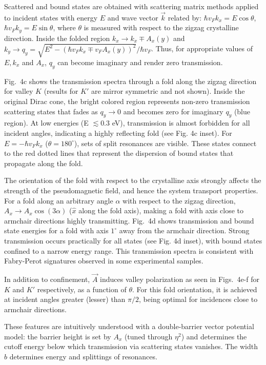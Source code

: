 \documentclass[journal=jacsat,manuscript=article]{achemso}
\begin{document}
Scattered and bound states are obtained with scattering matrix  methods applied to incident states with energy $E$ and wave vector $\vec{k}$ related by: $\hbar v_F k_x=E\cos\theta$, $\hbar v_F k_y=E\sin\theta$, where $\theta$ is measured with respect to the zigzag crystalline direction. Inside the folded region $k_x\rightarrow k_x\mp A_x(y)$ and $k_y\rightarrow q_y=\sqrt{E^2-(\hbar v_F k_x\mp v_FA_x(y))^2}/\hbar v_F$. Thus, for appropriate values of $E, k_x$ and $A_x$, $q_y$ can become imaginary and render zero transmission.

Fig.~4c shows the transmission spectra through a fold along the zigzag direction for valley $K$ (results for $K'$ are mirror symmetric and not shown). Inside the original Dirac cone, the bright colored region represents non-zero transmission
scattering states that fades as $q_y\rightarrow 0$ and becomes zero for imaginary $q_y$ (blue region). At low energies (E $\lesssim 0.3$ eV), transmission is almost forbidden for all incident angles, indicating a highly reflecting fold (see Fig. 4c inset). For $E=-\hbar v_F k_x$ ($\theta=180^\circ$), sets of split resonances are visible. These states connect to the red dotted lines that represent the dispersion of bound states that propagate along the fold. 

The orientation of the fold with respect to the crystalline axis strongly affects the strength of the pseudomagnetic field, and hence the system transport properties. For a fold along an arbitrary angle $\alpha$ with respect to the zigzag direction, $A_{x}\rightarrow A_{x}\cos(3\alpha)$ ($\hat{x}$ along the fold axis), making a fold with axis close to armchair directions highly transmitting. Fig.~4d shows transmission and bound state energies for a fold with axis $1^\circ$ away from the armchair direction. Strong transmission occurs practically for all states (see Fig. 4d inset), with bound states confined to a narrow energy range. This transmission spectra is consistent with Fabry-Perot signatures observed in some experimental samples.

In addition to confinement, $\vec{A}$ induces valley polarization\cite{Carrillo-Bastos2014,Carrillo-Bastos2016,SettnesValleyFilter} as seen in Figs.~4e-f for $K$  and $K'$ respectively, as a function of $\theta$. For this fold orientation, it is achieved at incident angles greater (lesser) than $\pi/2$, being optimal for incidences close to armchair directions. 

These features are intuitively understood with a double-barrier vector potential model: the barrier height is set by $A_x$ (tuned through $\eta^2$) and determines the cutoff energy below which transmission via scattering states vanishes. The width $b$ determines energy and splittings of resonances. 
\end{document}

